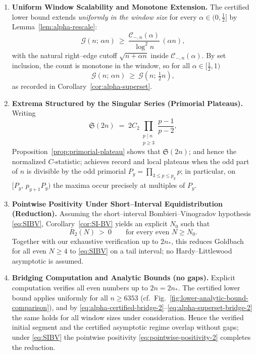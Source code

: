 \documentclass[11pt]{article}
\theoremstyle{inline}
\theoremstyle{break}
\theoremstyle{break}
\theoremstyle{break}
\theoremstyle{break}
\theoremstyle{break}
\theoremstyle{break}
\theoremstyle{break}
\theoremstyle{inline}
\newcommand{\xMertens}{6353} %
\newcommand{\CminusProductAlpha}[2]{\mathcal{C}_{-,#2}\!\left(#1\right)}
\newcommand{\nprodstar}{n_{\ast}}  %
\begin{document}
\begin{enumerate}
  \item \textbf{Uniform Window Scalability and Monotone Extension.}
  The certified lower bound extends \emph{uniformly in the window size} for every \( \alpha\in(0,\tfrac12] \) by Lemma~\ref{lem:alpha-rescale}:
  \begin{equation}\label{eq:alpha-certified-bridge-2}
    \mathcal{G}(n;\,\alpha n)\ \ge\ \frac{\CminusProductAlpha{\alpha}{n}}{\log^2 n}\,(\alpha n),
  \end{equation}
  with the natural right–edge cutoff \( \sqrt{n+\alpha n} \) inside \( \CminusProductAlpha{\alpha}{n} \).
  By set inclusion, the count is monotone in the window, so for all \( \alpha\in[\tfrac12,1) \)
  \begin{equation}\label{eq:alpha-superset-bridge-2}
    \mathcal{G}(n;\,\alpha n)\ \ge\ \mathcal{G}\!\left(n;\,\tfrac12 n\right),
  \end{equation}
  as recorded in Corollary~\ref{cor:alpha-superset}.

  \item \textbf{Extrema Structured by the Singular Series (Primorial Plateaus).}
  Writing
  \begin{equation}\label{eq:sing-series-bridge-2}
    \mathfrak S(2n)\;=\;2C_2\prod_{\substack{p\mid n\\ p\ge 3}}\frac{p-1}{p-2},
  \end{equation}
  Proposition~\ref{prop:primorial-plateau} shows that \( \mathfrak S(2n) \); and hence the normalized \( C \)-statistic; achieves record and local plateaus when the odd part of \(n\) is divisible by the odd primorial \( P_y=\prod_{3\le p\le p_y}p \); in particular, on \( [P_y,\,p_{y+1}P_y) \) the maxima occur precisely at multiples of \( P_y \).

  \item \textbf{Pointwise Positivity Under Short–Interval Equidistribution (Reduction).}
  Assuming the short–interval Bombieri–Vinogradov hypothesis \eqref{eq:SIBV}, Corollary~\ref{cor:SI-BV} yields an explicit \( N_0 \) such that
  \begin{equation}\label{eq:pointwise-positivity-2}
    R_2(N)\ >\ 0\qquad\text{for every even }N\ge N_0.
  \end{equation}
  Together with our exhaustive verification up to \( 2\nprodstar \), this reduces Goldbach for all even \( N\ge 4 \) to \eqref{eq:SIBV} on a tail interval; no Hardy–Littlewood asymptotic is assumed.

  \item \textbf{Bridging Computation and Analytic Bounds (no gaps).}
  Explicit computation verifies all even numbers up to \(2n=2\nprodstar\).  The certified lower bound applies uniformly for all \( n\ge \xMertens \) (cf.\ Fig.~\ref{fig:lower-analytic-bound-comparison}), and by \eqref{eq:alpha-certified-bridge-2}–\eqref{eq:alpha-superset-bridge-2} the same holds for all window sizes under consideration. Hence the verified initial segment and the certified asymptotic regime overlap without gaps; under \eqref{eq:SIBV} the pointwise positivity \eqref{eq:pointwise-positivity-2} completes the reduction.
\end{enumerate}
\end{document}
